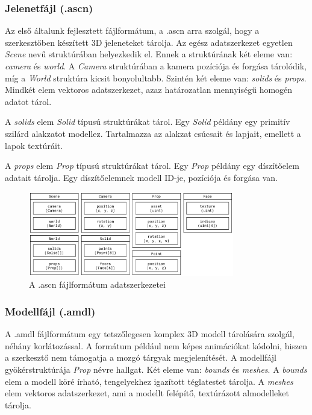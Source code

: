 \pagebreak

\subsubsection{Jelenetfájl (.ascn)}

Az első általunk fejlesztett fájlformátum, a .ascn arra szolgál, hogy a szerkesztőben készített
3D jeleneteket tárolja. Az egész adatszerkezet egyetlen \emph{Scene} nevű struktúrában helyezkedik
el. Ennek a struktúrának két eleme van: \emph{camera} és \emph{world}. A \emph{Camera} struktúrában
a kamera pozíciója és forgása tárolódik, míg a \emph{World} struktúra kicsit bonyolultabb. Szintén
két eleme van: \emph{solids} és \emph{props}. Mindkét elem vektoros adatszerkezet, azaz
határozatlan mennyiségű homogén adatot tárol.

A \emph{solids} elem \emph{Solid} típusú struktúrákat tárol. Egy \emph{Solid} példány egy primitív
szilárd alakzatot modellez. Tartalmazza az alakzat csúcsait és lapjait, emellett a lapok textúráit.

A \emph{props} elem \emph{Prop} típusú struktúrákat tárol. Egy \emph{Prop} példány egy díszítőelem
adatait tárolja. Egy díszítőelemnek modell ID-je, pozíciója és forgása van.

\begin{figure}[h]
      \centering
      \includegraphics[width=0.8\textwidth]{parts/developer-documentation/editor/images/ascn.png}
      \caption{A .ascn fájlformátum adatszerkezetei}
\end{figure}

\pagebreak

\subsubsection{Modellfájl (.amdl)}

A .amdl fájlformátum egy tetszőlegesen komplex 3D modell tárolására szolgál, néhány korlátozással.
A formátum például nem képes animációkat kódolni, hiszen a szerkesztő nem támogatja a mozgó tárgyak
megjelenítését. A modellfájl gyökérstruktúrája \emph{Prop} névre hallgat. Két eleme van:
\emph{bounds} és \emph{meshes}. A \emph{bounds} elem a modell köré írható,
tengelyekhez igazított téglatestet tárolja. A \emph{meshes} elem vektoros adatszerkezet, ami a
modellt felépítő, textúrázott almodelleket tárolja.

